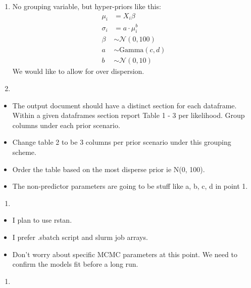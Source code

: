 \documentclass[
  letterpaper,
]{article}
\providecommand{\tightlist}{%
  \setlength{\itemsep}{0pt}\setlength{\parskip}{0pt}}\usepackage{longtable,booktabs,array}
\begin{document}
\begin{enumerate}
\def\labelenumi{\arabic{enumi}.}
\item
  No grouping variable, but hyper-priors like this:\\
  \begin{equation*}
  \begin{aligned} 
   \mu_i &= X_i \beta \\ 
   \sigma_i &= a \cdot \mu_i^b \\
   \beta &\sim \mathcal{N}(0, 100) \\
   a &\sim \text{Gamma}(c, d) \\ 
   b &\sim \mathcal{N}(0, 10)
  \end{aligned}
  \end{equation*} We would like to allow for over dispersion.
\item
\end{enumerate}

\begin{itemize}
\item
  The output document should have a distinct section for each dataframe.
  Within a given dataframes section report Table 1 - 3 per likelihood.
  Group columns under each prior scenario.
\item
  Change table 2 to be 3 columns per prior scenario under this grouping
  scheme.
\item
  Order the table based on the most disperse prior ie N(0, 100).
\item
  The non-predictor parameters are going to be stuff like a, b, c, d in
  point 1.
\end{itemize}

\begin{enumerate}
\def\labelenumi{\arabic{enumi}.}
\setcounter{enumi}{2}
\tightlist
\item
\end{enumerate}

\begin{itemize}
\tightlist
\item
  I plan to use rstan.\\
\item
  I prefer .sbatch script and slurm job arrays.
\item
  Don't worry about specific MCMC parameters at this point. We need to
  confirm the models fit before a long run.
\end{itemize}

\begin{enumerate}
\def\labelenumi{\arabic{enumi}.}
\setcounter{enumi}{3}
\tightlist
\item
\end{enumerate}
\end{document}
